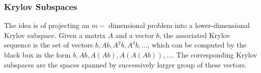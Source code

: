 \documentclass[12pt, oneside]{book}
\theoremstyle{definition}
\theoremstyle{definition}
\theoremstyle{remark}
\begin{document}
\subsubsection{Krylov Subspaces}
The idea is of projecting an $m-$ dimensional problem into a lower-dimensional Krylov subspace. Given a matrix $A$ and a vector $b$, the associated Krylov sequence is the set of vectors $b,Ab,A^2b,A^3b,\ldots$, which can be computed by the black box in the form $b,Ab,A(Ab),A(A(Ab)),\ldots$. The corresponding Krylov subspaces are the spaces spanned by successively larger group of these vectors. 
\end{document}
